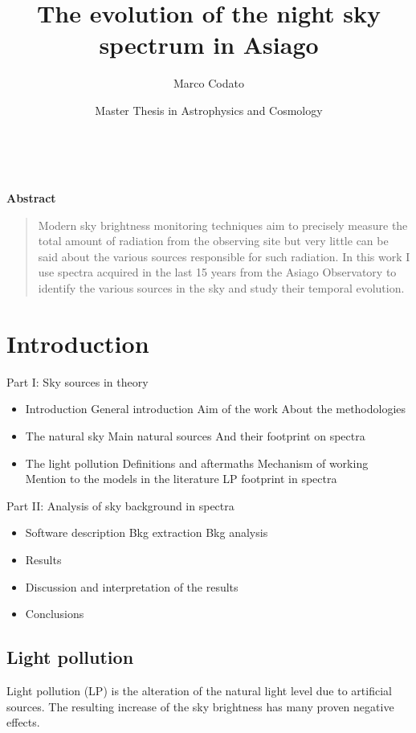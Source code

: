 \documentclass[a4paper, titlepage, 10pt]{book}
\title{The evolution of the night sky spectrum in Asiago}
\author{Marco Codato}
\date{Master Thesis in Astrophysics and Cosmology}
\newenvironment{abstract}{%
	\newpage\thispagestyle{empty}\vspace*{3\baselineskip}
	\begin{center}\Large\textbf{Abstract}\end{center}%
	\begin{quotation}%
	}{\end{quotation}\clearpage}
\begin{document}
\maketitle

\thispagestyle{empty}
\
\begin{abstract}
	Modern sky brightness monitoring techniques aim to precisely measure the total amount of radiation from the observing site but very little can be said about the various sources responsible for such radiation.
	In this work I use spectra acquired in the last 15 years from the Asiago Observatory to identify the various sources in the sky and study their temporal evolution.
\end{abstract}

\clearpage

\tableofcontents

\chapter{Introduction}
Part I: Sky sources in theory
\begin{itemize}
	\item Introduction
		\subitem General introduction
		\subitem Aim of the work
		\subitem About the methodologies
	\item The natural sky
		\subitem Main natural sources
		\subitem And their footprint on spectra
	\item The light pollution
		\subitem Definitions and aftermaths
		\subitem Mechanism of working
		\subitem Mention to the models in the literature
		\subitem LP footprint in spectra
\end{itemize}
Part II: Analysis of sky background in spectra
\begin{itemize}
	\item Software description
		\subitem Bkg extraction
		\subitem Bkg analysis
	\item Results
	\item Discussion and interpretation of the results
	\item Conclusions
\end{itemize}

\section{Light pollution}
Light pollution (LP) is the alteration of the natural light level due to artificial sources. The resulting increase of the sky brightness has many proven negative effects.
\end{document}
